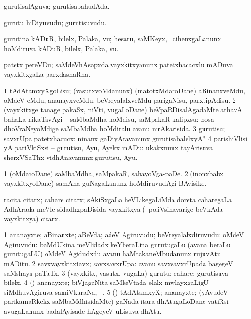 \bentry
{}
\gl{\gu}
\bmng
gurutisalAguva; gurutisabahudAda. 
\emng
\eentry

\bentry
{}
\gl{\nA}
\bmng
gurutu hiDiyuvudu; gurutisuvudu. 
\emng

\noindent
\gl{\pagu}
\bmng
{} gurutina kADuR, bilelx, Palaka, \mo vu; hesaru, saMKeyx, \mo\ cihenxgaLanunx hoMdiruva kADuR, bilelx, Palaka, \mo vu. 
\emng
\eentry

\bentry
{}
\gl{\nA}
\bmng
patetx pereVDu; saMdeVhAsapxda vayxkitxyanunx patetxhacacxlu mADuva vayxkitxgaLa parxdashaRna. 
\emng
\eentry

\bentry
{}
\gl{\sakirx}
\bmng
\bnum
\num{1} tAdAtamxyXgoLisu; (vasutxvoMdanunx) (matotxMdaroDane) aBinanxveMdu, oMdeV eMdu, ananayxveMdu, beVreyalalxveMdu-parigaNisu, parxtipAdisu. 
\num{2} (vayxkitxge tanage pakaSx, niVti, \mo vugaLoDane) beVpaRDisalAgadaMte athavA bahaLa nikaTavAgi -- saMbaMdha hoMdisu, saMpakaR kalipxsu:  hosa dhoVraNeyoMdige saMbaMdha hoMdiralu avanu nirAkarisida. 
\num{3} gurutisu; savxrUpa patetxhacucx:  ninanx gaDiyAravanunx gurutisabalelxyA? 
\num{4} parishiVlisi yA pariVkiSxsi -- gurutisu, Ayu, Ayekx mADu:  ukakxnunx tayArisuva sherxVSaThx vidhAnavanunx gurutisu, Ayu. 
\enum
\emng

\noindent
\gl{\akirx}
\bmng
\bnum
\num{1} (oMdaroDane) saMbaMdha, saMpakaR, sahayoVga-paDe. 
\num{2} (inonxbabx vayxkitxyoDane) samAna guNagaLanunx hoMdiruvudAgi BAvisiko. 
\enum
\emng
\eentry

\bentry
{}
\gl{\nA}
\bmng
racita citarx; cahare citarx; sAkiSxgaLa heVLikegaLiMda doreta caharegaLa AdhArada meVle sidadhxpaDisida vayxkitxya (\kanmu\ poliVsinavarige beVkAda vayxkitxya) citarx. 
\emng
\eentry

\bentry
{}
\gl{\nA}
\bmng
\bnum
\num{1} ananayxte; aBinanxte; aBeVda; adeV Agiruvudu; beVreyalalxdiruvudu; oMdeV Agiruvudu:  baMdUkina meVlidadx keYberaLina gurutugaLu (avana beraLu gurutugaLU) oMdeV Agidudxdu avanu haMtakaneMbudanunx rujuvAtu mADitu. 
\num{2} savxvayxkitxtavx; savxsavxrUpa:  avanu savxsavxrUpada bagegeV saMshaya paTaTx. 
\num{3} (vayxkitx, vasutx, \mo vugaLa) gurutu; cahare:  gurutisuva bilelx. 
\num{4} (\biVga) ananayxte; biVjagaNita saMkeVtada elalx mwlayxgaLigU siMdhuvAgiruva samiVkaraNa, \udA\ . 
\num{5} (\ga) tAdAtamxyX; ananayxte; (yAvudeV parikamaRkekx saMbaMdhisidaMte) gaNada itara dhAtugaLoDane vatiRsi avugaLanunx badalAyisade hAgeyeV uLisuva dhAtu. 
\enum
\emng
\eentry

